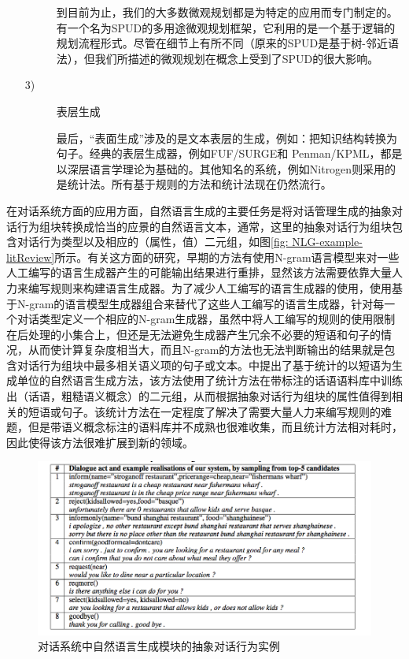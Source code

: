 \begin{enumerate}
\begin{description}
到目前为止，我们的大多数微观规划都是为特定的应用而专门制定的。有一个名为SPUD\cite{Stone 1997}的多用途微观规划框架，它利用的是一个基于逻辑的规划流程形式。尽管在细节上有所不同（原来的SPUD是基于树-邻近语法），但我们所描述的微观规划在概念上受到了SPUD的很大影响。

\item [3)] 表层生成

最后，“表面生成”涉及的是文本表层的生成，例如：把知识结构转换为句子。经典的表层生成器，例如FUF/SURGE\cite{Elhadad1992}和 Penman/KPML\cite{Matthiessen1991}，都是以深层语言学理论为基础的。其他知名的系统，例如Nitrogen\cite{Langkilde1998}则采用的是统计法。所有基于规则的方法和统计法现在仍然流行。

\end{description}

\end{enumerate}

在对话系统方面的应用方面，自然语言生成的主要任务是将对话管理生成的抽象对话行为组块转换成恰当的应景的自然语言文本，通常，这里的抽象对话行为组块包含对话行为类型以及相应的（属性，值）二元组，如图\ref{fig: NLG-example-litReview}所示\cite{Wen2015}。有关这方面的研究，早期的方法有使用N-gram语言模型来对一些人工编写的语言生成器产生的可能输出结果进行重排\cite{Langkilde1998}，显然该方法需要依靠大量人力来编写规则来构建语言生成器。为了减少人工编写的语言生成器的使用，\cite{Oh2000}使用基于N-gram的语言模型生成器组合来替代了这些人工编写的语言生成器，针对每一个对话类型定义一个相应的N-gram生成器，虽然\cite{Oh2000}中将人工编写的规则的使用限制在后处理的小集合上，但还是无法避免生成器产生冗余不必要的短语和句子的情况，从而使计算复杂度相当大，而且N-gram的方法也无法判断输出的结果就是包含对话行为组块中最多相关语义项的句子或文本。\cite{Mairesse2010, Mairesse2014}中提出了基于统计的以短语为生成单位的自然语言生成方法，该方法使用了统计方法在带标注的话语语料库中训练出（话语，粗糙语义概念）的二元组，从而根据抽象对话行为组块的属性值得到相关的短语或句子。该统计方法在一定程度了解决了需要大量人力来编写规则的难题，但是带语义概念标注的语料库并不成熟也很难收集，而且统计方法相对耗时，因此使得该方法很难扩展到新的领域。

\begin{figure}[htb]
\centering
\includegraphics[width=12cm]{figures/NLG-example-litReview.png}
\caption{对话系统中自然语言生成模块的抽象对话行为实例}
\label{fig:NLG-example-litReview}
\end{figure}

